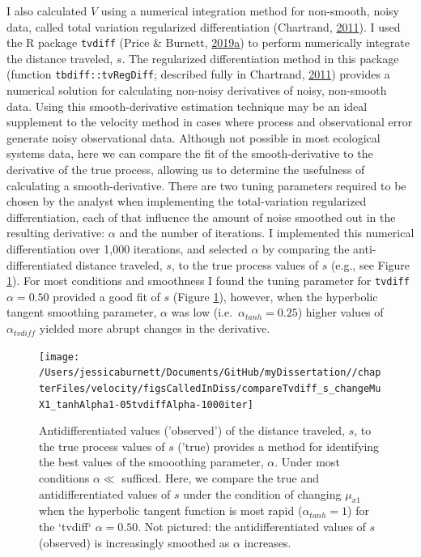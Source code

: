 \documentclass[12pt,twoside,openany]{reedthesis}
\begin{document}
I also calculated \(V\) using a numerical integration method for non-smooth, noisy data, called total variation regularized differentiation (Chartrand, \protect\hyperlink{ref-chartrand2011numerical}{2011}). I used the R package \texttt{tvdiff} (Price \& Burnett, \protect\hyperlink{ref-price2019tvdiff}{2019}\protect\hyperlink{ref-price2019tvdiff}{a}) to perform numerically integrate the distance traveled, \(s\). The regularized differentiation method in this package (function \texttt{tbdiff::tvRegDiff}; described fully in Chartrand, \protect\hyperlink{ref-chartrand2011numerical}{2011}) provides a numerical solution for calculating non-noisy derivatives of noisy, non-smooth data. Using this smooth-derivative estimation technique may be an ideal supplement to the velocity method in cases where process and observational error generate noisy observational data. Although not possible in most ecological systems data, here we can compare the fit of the smooth-derivative to the derivative of the true process, allowing us to determine the usefulness of calculating a smooth-derivative. There are two tuning parameters required to be chosen by the analyst when implementing the total-variation regularized differentiation, each of that influence the amount of noise smoothed out in the resulting derivative: \(\alpha\) and the number of iterations. I implemented this numerical differentiation over 1,000 iterations, and selected \(\alpha\) by comparing the anti-differentiated distance traveled, \(s\), to the true process values of \(s\) (e.g., see Figure \ref{fig:antiDiffComp}). For most conditions and smoothness I found the tuning parameter for \texttt{tvdiff} \(\alpha=0.50\) provided a good fit of \(s\) (Figure \ref{fig:antiDiffComp}), however, when the hyperbolic tangent smoothing parameter, \(\alpha\) was low (i.e.~\(\alpha_{tanh}=0.25\)) higher values of \(\alpha_{tvdiff}\) yielded more abrupt changes in the derivative.
\begin{figure}
\texttt{[image: /Users/jessicaburnett/Documents/GitHub/myDissertation//chapterFiles/velocity/figsCalledInDiss/compareTvdiff\_s\_changeMuX1\_tanhAlpha1-05tvdiffAlpha-1000iter]} \caption{Antidifferentiated values ('observed') of the distance traveled, $s$, to the true process values of $s$ ('true) provides a method for identifying the best values of the smooothing parameter, $\alpha$. Under most conditions $\alpha \ll$ sufficed. Here, we compare the true and antidifferentiated values of $s$ under the condition of changing $\mu_{x1}$ when the hyperbolic tangent function is most rapid ($\alpha_{tanh}=1$) for the `tvdiff` $\alpha=0.50$. Not pictured: the antidifferentiated values of $s$ (observed) is increasingly smoothed as $\alpha$ increases.}\label{fig:antiDiffComp}
\end{figure}
\end{document}
